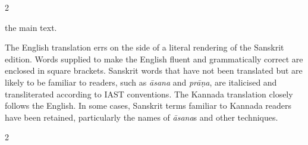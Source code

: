 \begin{nohyp}
\begin{multicols*}{2}
\begin{eng}
the main text.

The English translation errs on the side of a literal rendering of the Sanskrit edition. Words supplied to make the English fluent and grammatically correct are enclosed in square brackets. Sanskrit words that have not been translated but are likely to be familiar to readers, such as \emph{āsana} and \emph{prāṇa}, are italicised and transliterated according to IAST conventions. The Kannada translation closely follows the English. In some cases, Sanskrit terms familiar to Kannada readers have been retained, particularly the names of \emph{āsana}s and other techniques.
\end{eng}
\end{multicols*}

\newpage

\begin{center}
\Section*{\notesname}%
\end{center}
\vskip 22pt

\begin{multicols*}{2}
\begin{eng}
\theendnotes
\end{eng}
\end{multicols*}
\end{nohyp}
